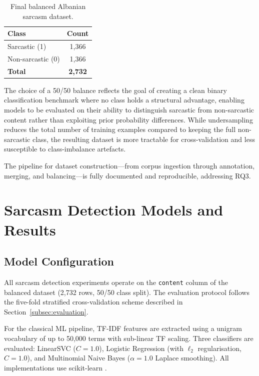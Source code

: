 \documentclass[12pt,a4paper]{article}
\begin{document}
\begin{table}[H]
    \centering
    \caption{Final balanced Albanian sarcasm dataset.}
    \label{tab:sarcasm_dataset}
    \begin{tabular}{lc}
        \toprule
        \textbf{Class}        & \textbf{Count} \\
        \midrule
        Sarcastic (1)         & 1{,}366 \\
        Non-sarcastic (0)     & 1{,}366 \\
        \midrule
        \textbf{Total}        & \textbf{2{,}732} \\
        \bottomrule
    \end{tabular}
\end{table}

The choice of a 50/50 balance reflects the goal of creating a clean binary classification benchmark where no class holds a structural advantage, enabling models to be evaluated on their ability to distinguish sarcastic from non-sarcastic content rather than exploiting prior probability differences. While undersampling reduces the total number of training examples compared to keeping the full non-sarcastic class, the resulting dataset is more tractable for cross-validation and less susceptible to class-imbalance artefacts.

The pipeline for dataset construction---from corpus ingestion through annotation, merging, and balancing---is fully documented and reproducible, addressing RQ3.

\newpage
\section{Sarcasm Detection Models and Results}
\label{sec:sarcasm_results}

\subsection{Model Configuration}
\label{subsec:model_config}

All sarcasm detection experiments operate on the \texttt{content} column of the balanced dataset (2,732 rows, 50/50 class split). The evaluation protocol follows the five-fold stratified cross-validation scheme described in Section~\ref{subsec:evaluation}.

For the classical ML pipeline, TF-IDF features are extracted using a unigram vocabulary of up to 50,000 terms with sub-linear TF scaling. Three classifiers are evaluated: LinearSVC ($C=1.0$), Logistic Regression (with $\ell_2$ regularisation, $C=1.0$), and Multinomial Naive Bayes ($\alpha=1.0$ Laplace smoothing). All implementations use scikit-learn \citep{pedregosa2011scikit}.
\end{document}
